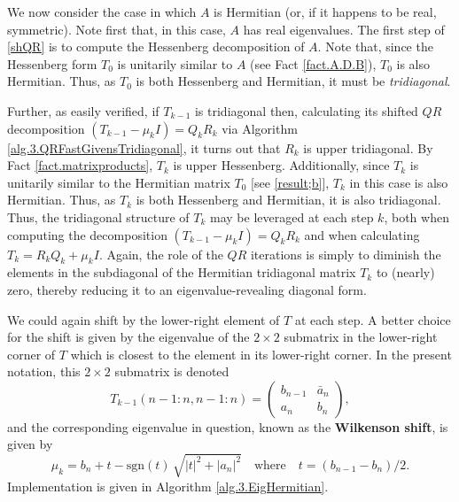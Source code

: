 
\noindent We now consider the case in which $A$ is Hermitian (or, if it happens to be real, symmetric).  Note first that, in this case, $A$ has
real eigenvalues.  The first step of \eqref{shQR} is to compute the Hessenberg decomposition of $A$.
Note that, since the Hessenberg form $T_0$ is unitarily similar to $A$ (see Fact \ref{fact.A.D.B}), $T_0$ is also Hermitian.
Thus, as $T_0$ is both Hessenberg and Hermitian, it must be {\it tridiagonal}.

Further, as easily verified, if $T_{k-1}$ is tridiagonal then, calculating its shifted $QR$ decomposition $(T_{k-1}-\mu_k I)={Q}_{k} {R}_{k}$
via Algorithm \ref{alg.3.QRFastGivensTridiagonal}, it turns out that ${R}_{k}$ is upper tridiagonal.
By Fact \ref{fact.matrixproducts}, $T_k$ is upper Hessenberg.
Additionally, since $T_k$ is unitarily similar to the Hermitian matrix $T_0$ [see \eqref{result;b}],
$T_{k}$ in this case is also Hermitian.  Thus, as $T_{k}$ is both Hessenberg and Hermitian, it is also tridiagonal.
Thus, the tridiagonal structure of $T_{k}$ may be leveraged at each step $k$, both when computing the
decomposition $(T_{k-1}-\mu_k I)={Q}_{k} {R}_{k}$ and when calculating $T_{k} = {R}_{k} {Q}_{k} + \mu_k I$.  Again,
the role of the $QR$ iterations is simply to diminish the elements in the subdiagonal of the Hermitian tridiagonal matrix
$T_{k}$ to (nearly) zero, thereby reducing it to an eigenvalue-revealing diagonal form.

We could again shift by the lower-right element of $T$ at each step.  A better choice for the shift is given by the eigenvalue of the $2\times 2$ submatrix in the
lower-right corner of $T$ which is closest to the element in its lower-right corner.  In the present notation, this $2\times 2$ submatrix is denoted
\begin{equation*}
  T_{k-1}(n-1:n,n-1:n) = \begin{pmatrix} b_{n-1} & \bar a_{n} \\ a_{n} & b_n \end{pmatrix},
\end{equation*}
and the corresponding eigenvalue in question, known as the {\bf Wilkenson shift}, is given by
\begin{equation}
  \mu_k = b_n + t - \textrm{sgn}(t)\,\sqrt{|t|^2 + |a_n|^2} \quad \textrm{where} \quad t=(b_{n-1}-b_n)/2.
\end{equation}
Implementation is given in Algorithm \ref{alg.3.EigHermitian}.
\clearpage

